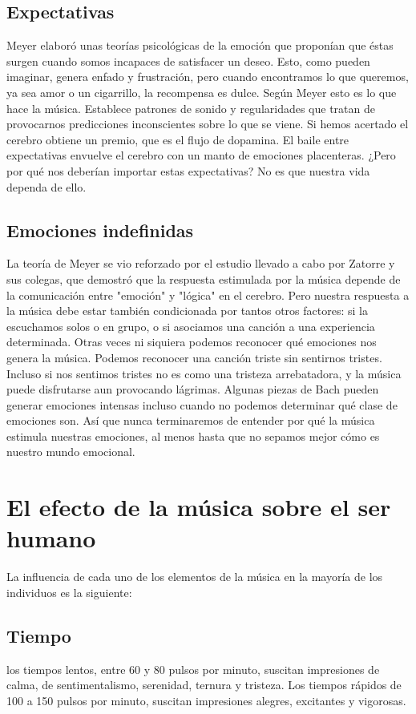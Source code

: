 \documentclass{bmcart}
\begin{document}
\subsection*{Expectativas}
Meyer elaboró unas teorías psicológicas de la emoción que proponían que éstas surgen cuando somos incapaces de satisfacer un deseo.
Esto, como pueden imaginar, genera enfado y frustración, pero cuando encontramos lo que queremos, ya sea amor o un cigarrillo, la recompensa es dulce.
Según Meyer esto es lo que hace la música. Establece patrones de sonido y regularidades que tratan de provocarnos predicciones inconscientes sobre lo que se viene.
Si hemos acertado el cerebro obtiene un premio, que es el flujo de dopamina.
El baile entre expectativas envuelve el cerebro con un manto de emociones placenteras.
¿Pero por qué nos deberían importar estas expectativas? No es que nuestra vida dependa de ello.
\subsection*{Emociones indefinidas}
La teoría de Meyer se vio reforzado por el estudio llevado a cabo por Zatorre y sus colegas, que demostró que la respuesta estimulada por la música depende de la comunicación entre "emoción" y "lógica" en el cerebro.
Pero nuestra respuesta a la música debe estar también condicionada por tantos otros factores: si la escuchamos solos o en grupo, o si asociamos una canción a una experiencia determinada.
Otras veces ni siquiera podemos reconocer qué emociones nos genera la música.
Podemos reconocer una canción triste sin sentirnos tristes. Incluso si nos sentimos tristes no es como una tristeza arrebatadora, y la música puede disfrutarse aun provocando lágrimas.
Algunas piezas de Bach pueden generar emociones intensas incluso cuando no podemos determinar qué clase de emociones son.
Así que nunca terminaremos de entender por qué la música estimula nuestras emociones, al menos hasta que no sepamos mejor cómo es nuestro mundo emocional.
\section*{El efecto de la música sobre el ser humano}
La influencia de cada uno de los elementos de la música en la mayoría de los individuos es la siguiente:
\subsection*{Tiempo}
los tiempos lentos, entre 60 y 80 pulsos por minuto, suscitan impresiones de calma, de sentimentalismo, serenidad, ternura y tristeza. Los tiempos rápidos de 100 a 150 pulsos por minuto, suscitan impresiones alegres, excitantes y vigorosas.
\end{document}
